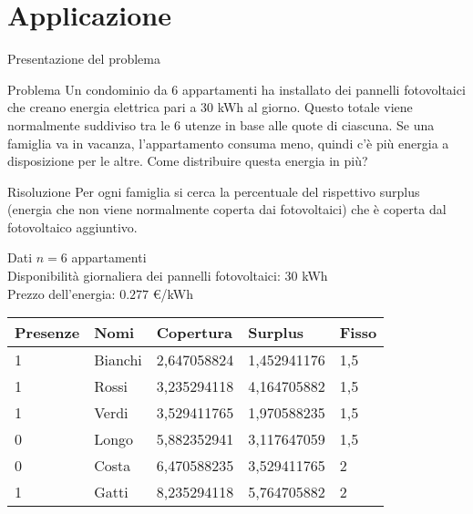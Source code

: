 \documentclass{beamer}
\begin{document}
\section{Applicazione}

\begin{frame}{Presentazione del problema}
	\begin{block}{Problema}
		Un condominio da 6 appartamenti ha installato dei pannelli fotovoltaici che creano energia elettrica pari a 30 kWh al giorno. Questo totale viene normalmente suddiviso tra le 6 utenze in base alle quote di ciascuna. Se una famiglia va in vacanza, l'appartamento consuma meno, quindi c'è più energia a disposizione per le altre. Come distribuire questa energia in più?
	\end{block}
	\begin{block}{Risoluzione}
		Per ogni famiglia si cerca la percentuale del rispettivo surplus (energia che non viene normalmente coperta dai fotovoltaici) che è coperta dal fotovoltaico aggiuntivo.
	\end{block}
\end{frame}

\begin{frame}{Dati}
	$n=6$ appartamenti\\
	Disponibilità giornaliera dei pannelli fotovoltaici: $30$ kWh\\
	Prezzo dell'energia: $0.277$ \euro/kWh
	\begin{tabular}{|l|l|l|l|l|}
		\hline
		\textbf{Presenze} & \textbf{Nomi} & \textbf{Copertura} & \textbf{Surplus} & \textbf{Fisso}\\
		\hline
		1 & Bianchi & 2,647058824 & 1,452941176 & 1,5 \\
		1 & Rossi & 3,235294118 & 4,164705882 & 1,5	\\
		1 & Verdi & 3,529411765 & 1,970588235 & 1,5	\\
		0 & Longo & 5,882352941 & 3,117647059 & 1,5	\\
		0 & Costa & 6,470588235 & 3,529411765 & 2 \\
		1 & Gatti & 8,235294118 & 5,764705882 & 2 \\
		\hline
	\end{tabular}
\end{frame}
\end{document}
